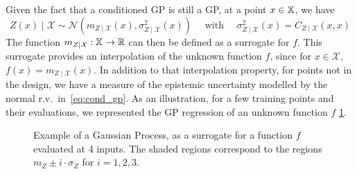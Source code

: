 \documentclass[../../Main_ManuscritThese.tex]{subfiles}
\newcommand\imgpath{/home/victor/acadwriting/Manuscrit/Text/Chapter4/img/}
\begin{document}
Given the fact that a conditioned GP is still a GP, at a point $x \in \mathbb{X}$, we have
\begin{equation}
  \label{eq:cond_gp}
  Z(x) \mid \mathcal{X} \sim \mathcal{N}\left(m_{Z\mid \mathcal{X}}(x), \sigma^2_{Z\mid \mathcal{X}}(x)\right) \quad \text{ with } \quad \sigma^2_{Z\mid \mathcal{X}}(x) = C_{Z \mid \mathcal{X}}(x, x)
\end{equation}
The function $m_{Z \mid \mathcal{X}}: \mathbb{X} \rightarrow \mathbb{R}$ can then be defined as a surrogate for $f$. This surrogate provides an interpolation of the unknown function $f$, since for $x \in \mathcal{X}$, $f(x) = m_{Z \mid \mathcal{X}}(x)$.
In addition to that interpolation property, for points not in the design, we have a measure of the epistemic uncertainty modelled by the normal r.v.\ in~\eqref{eq:cond_gp}. As an illustration, for a few training points and their evaluations, we represented the GP regression of an unknown function $f$ \cref{fig:example_GP}.

\begin{figure}[ht]
  \centering
  
  \caption[Illustration of GP regression]{\label{fig:example_GP} Example of a Gaussian Process, as a surrogate for a function $f$ evaluated at 4 inputs. The shaded regions correspond to the regions $m_Z \pm i \cdot \sigma_Z$ for $i=1, 2,3$.}
\end{figure}
\end{document}
